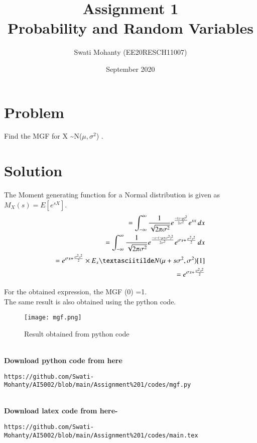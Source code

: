 \documentclass[journal,12pt,twocolumn]{IEEEtran}
\title{Assignment 1
\\Probability and Random Variables }
\author{Swati Mohanty (EE20RESCH11007) }
\date{September 2020}
\begin{document}
\maketitle


\section{Problem}
Find the MGF for X \textasciitilde N(${\mu,\sigma^2}$)
.
\section{Solution}
The Moment generating function for a Normal distribution is given as ${M_X(s) = E[e^{sX}]}$.
\begin{align}
    = \int_{-\infty}^{\infty} \frac{1}{\sqrt{2\pi\sigma^2}}e^{\frac{-(x-\mu)^2}{2\sigma^2}}e^{ sx} \,dx 
    \\ = \int_{-\infty}^{\infty} \frac{1}{\sqrt{2\pi\sigma^2}}e^{\frac{-x-
    (-\mu+\sigma^2)^2}{2\sigma^2}}e^{ \sigma s + \frac{\sigma^2 s^2}{2}} \,dx 
    \\ = e^{ \sigma s + \frac{\sigma^2 s^2}{2}} \times E_x \textasciitilde N(\mu+ s\sigma^2 ,\sigma^2)[1]
    \\= e^{ \sigma s + \frac{\sigma^2 s^2}{2}}
\end{align}

For the obtained expression, the MGF (0) =1.
\\The same result is also obtained using the python code.
\begin{figure}[h]
\renewcommand{\theenumi}{1}
\centering
\texttt{[image: mgf.png]}
\caption{Result obtained from python code }
\label{Fig:1}
\end{figure}
\\\textbf{Download python code from here}\\
\begin{lstlisting}
https://github.com/Swati-Mohanty/AI5002/blob/main/Assignment%201/codes/mgf.py
\end{lstlisting}
\\\textbf{Download latex code from here-}\\
\begin{lstlisting}
https://github.com/Swati-Mohanty/AI5002/blob/main/Assignment%201/codes/main.tex
\end{lstlisting}
\end{document}
